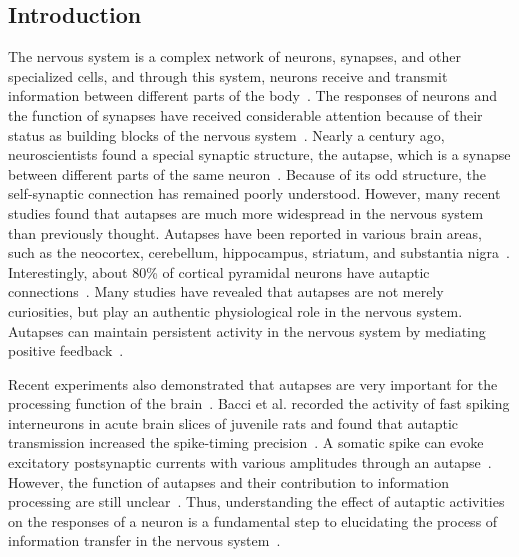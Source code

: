 \documentclass[twocolumn,showpacs,preprintnumbers,amsmath,amssymb,pre,superscriptaddress]{revtex4-1}
\begin{document}
\begin{CJK}{UTF8}{gbsn}
\section{Introduction}
%
The nervous system is a complex network of neurons, synapses, and other specialized cells, and through this system, neurons receive and transmit information between different parts of the body~\cite{kandel}. The responses of neurons and the function of synapses have received considerable attention because of their status as building blocks of the nervous system~\cite{Bartos,Bennett,Connors}. Nearly a century ago, neuroscientists found a special synaptic structure, the autapse, which is a synapse between different parts of the same neuron~\cite{vander,Bekkers1998,yamaguichi}. Because of its odd structure, the self-synaptic connection has remained poorly understood. However, many recent studies found that autapses are much more widespread in the nervous system than previously thought. Autapses have been reported in various brain areas, such as the neocortex, cerebellum, hippocampus, striatum, and substantia nigra~\cite{lubke,Bekkers1998,flight,branco,Kimura,tamas}. Interestingly, about 80\% of cortical pyramidal neurons have autaptic connections~\cite{lubke}. Many studies have revealed that autapses are not merely curiosities, but play an authentic physiological role in the nervous system. Autapses can maintain persistent activity in the nervous system by mediating positive feedback~\cite{saada}.

Recent experiments also demonstrated that autapses are very important for the processing function of the brain~\cite{ikeda}. Bacci et al. recorded the activity of fast spiking interneurons in acute brain slices of juvenile rats and found that autaptic transmission increased the spike-timing precision~\cite{bacci}. A somatic spike can evoke excitatory postsynaptic currents with various amplitudes through an autapse~\cite{Kimura}. However, the function of autapses and their contribution to information processing are still unclear~\cite{ikeda,bekkers09}. Thus, understanding the effect of autaptic activities on the responses of a neuron is a fundamental step to elucidating the process of information transfer in the nervous system~\cite{salinas1,ychen2008,chenyl,quiroga}. 


\end{CJK}
\end{document}
